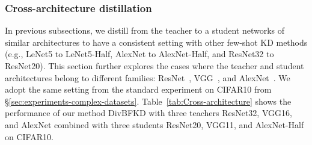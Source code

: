 \documentclass[12pt, a4paper, twoside]{book}
\numberwithin{equation}{chapter}
\theoremstyle{plain}
\theoremstyle{definition}
\theoremstyle{remark}
\newenvironment{foldable}{}{}
\newcommand*{\eg}{e.g.}
\begin{document}
\subsubsection{Cross-architecture distillation} \label{sec:experiments-crossarch}
\begin{foldable}
  In previous subsections, we distill from the teacher to a student networks of similar architectures to have a consistent setting with other few-shot \ac{KD} methods (\eg, LeNet5 to LeNet5-Half, AlexNet to AlexNet-Half, and ResNet32 to ResNet20).
  This section further explores the cases where the teacher and student architectures belong to different families: ResNet~\cite{he2016deep}, VGG~\cite{simonyan2014very}, and AlexNet~\cite{krizhevsky2012imagenet}.
  We adopt the same setting from the standard experiment on CIFAR10 from \S\ref{sec:experiments-complex-datasets}.
  Table~\ref{tab:Cross-architecture} shows the performance of our method DivBFKD with three teachers ResNet32, VGG16, and AlexNet combined with three students ResNet20, VGG11, and AlexNet-Half on CIFAR10.
\end{foldable}
\end{document}
